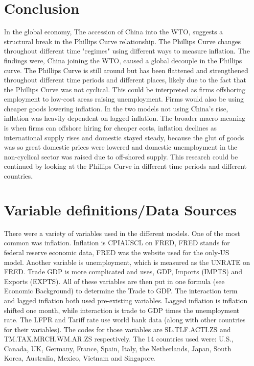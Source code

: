 \documentclass{article}
\begin{document}
\section{Conclusion}

In the global economy, The accession of China into the WTO, suggests a structural break in the Phillips Curve relationship. The Phillips Curve changes throughout different time "regimes" using different ways to measure inflation. The findings were, China joining the WTO, caused a global decouple in the Phillips curve. The Phillips Curve is still around but has been flattened and strengthened throughout different time periods and different places, likely due to the fact that the Phillips Curve was not cyclical. This could be interpreted as firms offshoring employment to low-cost areas raising unemployment\autocite{sciencedirect_hetero}. Firms would also be using cheaper goods lowering inflation. In the two models not using China's rise, inflation was heavily dependent on lagged inflation. The broader macro meaning is when firms can offshore hiring for cheaper costs, inflation declines as international supply rises and domestic stayed steady, because the glut of goods was so great domestic prices were lowered and domestic unemployment in the non-cyclical sector was raised due to off-shored supply. This research could be continued by looking at the Phillips Curve in different time periods and different countries.

\printbibliography[title={References}]

\appendix

\section{Variable definitions/Data Sources}

There were a variety of variables used in the different models. One of the most common was inflation. Inflation is CPIAUSCL on FRED, FRED stands for federal reserve economic data, FRED was the website used for the only-US model. Another variable is unemployment, which is measured as the UNRATE on FRED. Trade GDP is more complicated and uses, GDP, Imports (IMPTS) and Exports (EXPTS). All of these variables are then put in one formula (see Economic Background) to determine the Trade to GDP. The interaction term and lagged inflation both used pre-existing variables. Lagged inflation is inflation shifted one month, while interaction is trade to GDP times the unemployment rate. The LFPR and Tariff rate use world bank data (along with other countries for their variables). The codes for those variables are SL.TLF.ACTI.ZS and TM.TAX.MRCH.WM.AR.ZS respectively.  The 14 countries used were: U.S., Canada, UK, Germany, France, Spain, Italy, the Netherlands, Japan, South Korea, Australia, Mexico, Vietnam and Singapore.
\end{document}
